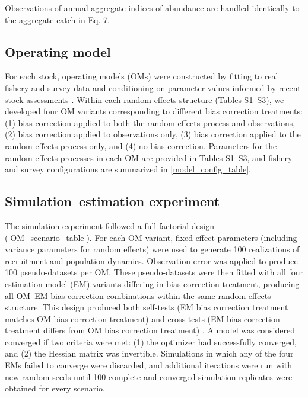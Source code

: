 \documentclass[
  12pt,
]{article}
\begin{document}
Observations of annual aggregate indices of abundance are handled
identically to the aggregate catch in Eq. 7.

\subsection{Operating model}\label{operating-model}

For each stock, operating models (OMs) were constructed by fitting to
real fishery and survey data and conditioning on parameter values
informed by recent stock assessments
\citep[e.g.,][]{nefsc2019haddock, nefsc2021mackerel, nefmc2023flounder}.
Within each random-effects structure (Tables S1--S3), we developed four
OM variants corresponding to different bias correction treatments: (1)
bias correction applied to both the random-effects process and
observations, (2) bias correction applied to observations only, (3) bias
correction applied to the random-effects process only, and (4) no bias
correction. Parameters for the random-effects processes in each OM are
provided in Tables S1--S3, and fishery and survey configurations are
summarized in \autoref{model_config_table}.

\subsection{Simulation--estimation
experiment}\label{simulationestimation-experiment}

The simulation experiment followed a full factorial design
(\autoref{OM_scenario_table}). For each OM variant, fixed-effect
parameters (including variance parameters for random effects) were used
to generate 100 realizations of recruitment and population dynamics.
Observation error was applied to produce 100 pseudo-datasets per OM.
These pseudo-datasets were then fitted with all four estimation model
(EM) variants differing in bias correction treatment, producing all
OM--EM bias correction combinations within the same random-effects
structure. This design produced both self-tests (EM bias correction
treatment matches OM bias correction treatment) and cross-tests (EM bias
correction treatment differs from OM bias correction treatment)
\citep{Deroba2015}. A model was considered converged if two criteria
were met: (1) the optimizer had successfully converged, and (2) the
Hessian matrix was invertible. Simulations in which any of the four EMs
failed to converge were discarded, and additional iterations were run
with new random seeds until 100 complete and converged simulation
replicates were obtained for every scenario.
\end{document}
